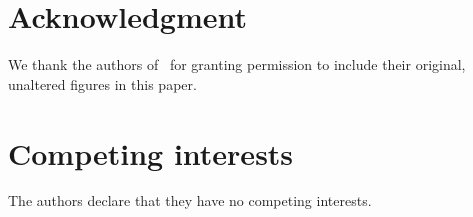 \section{Acknowledgment} 
We thank the authors of~\cite{liu_bolaa_2023, chen_scalable_2024, wang_dart-llm_2024, yu_co-navgpt_2023} for granting permission to include their original, unaltered figures in this paper.

\section{Competing interests}
The authors declare that they have no competing interests. 